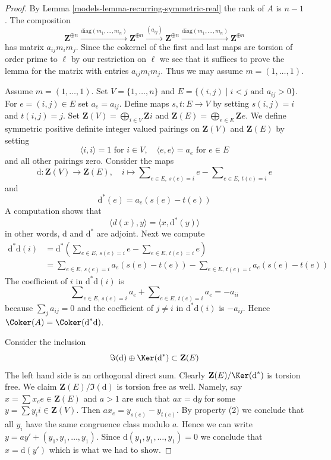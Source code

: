 \begin{proof}

By Lemma \ref{models-lemma-recurring-symmetric-real} the rank of $A$ is $n - 1$.
The composition
$$
\mathbf{Z}^{\oplus n} \xrightarrow{\text{diag}(m_1, \ldots, m_n)}
\mathbf{Z}^{\oplus n} \xrightarrow{(a_{ij})}
\mathbf{Z}^{\oplus n} \xrightarrow{\text{diag}(m_1, \ldots, m_n)}
\mathbf{Z}^{\oplus n}
$$
has matrix $a_{ij}m_im_j$. Since the cokernel of the first and last
maps are torsion of order prime to $\ell$ by our restriction on $\ell$
we see that it suffices to prove the lemma for the matrix
with entries $a_{ij}m_im_j$. Thus we may assume $m = (1, \ldots, 1)$.

\medskip\noindent
Assume $m = (1, \ldots, 1)$. Set $V = \{1, \ldots, n\}$ and
$E = \{(i, j) \mid i < j\text{ and }a_{ij} > 0\}$. For
$e = (i, j) \in E$ set $a_e = a_{ij}$. Define maps
$s, t : E \to V$ by setting $s(i, j) = i$ and $t(i, j) = j$.
Set
$\mathbf{Z}(V) = \bigoplus_{i \in V} \mathbf{Z}i$ and
$\mathbf{Z}(E) = \bigoplus_{e \in E} \mathbf{Z}e$.
We define symmetric positive definite integer valued pairings
on $\mathbf{Z}(V)$ and $\mathbf{Z}(E)$ by setting
$$
\langle i, i \rangle = 1\text{ for }i \in V, \quad
\langle e, e \rangle = a_e\text{ for }e \in E
$$
and all other pairings zero. Consider the maps
$$
\text{d} : \mathbf{Z}(V) \to \mathbf{Z}(E), \quad
i \longmapsto
\sum\nolimits_{e \in E,\ s(e) = i} e - \sum\nolimits_{e \in E,\ t(e) = i} e
$$
and
$$
\text{d}^*(e) = a_e(s(e) - t(e))
$$
A computation shows that
$$
\langle d(x), y\rangle = \langle x, \text{d}^*(y) \rangle
$$
in other words, $\text{d}$ and $\text{d}^*$ are adjoint. Next we compute
\begin{align*}
\text{d}^*\text{d}(i)
& =
\text{d}^*(
\sum\nolimits_{e \in E,\ s(e) = i} e - \sum\nolimits_{e \in E,\ t(e) = i} e) \\
& =
\sum\nolimits_{e \in E,\ s(e) = i} a_e(s(e) - t(e)) -
\sum\nolimits_{e \in E,\ t(e) = i} a_e(s(e) - t(e))
\end{align*}
The coefficient of $i$ in $\text{d}^*\text{d}(i)$ is
$$
\sum\nolimits_{e \in E,\ s(e) = i} a_e +
\sum\nolimits_{e \in E,\ t(e) = i} a_e = - a_{ii}
$$
because $\sum_j a_{ij} = 0$ and the coefficient of
$j \not = i$ in $\text{d}^*\text{d}(i)$ is $-a_{ij}$.
Hence $\Coker(A) = \Coker(\text{d}^*\text{d})$.

\medskip\noindent
Consider the inclusion
$$
\Im(\text{d}) \oplus \Ker(\text{d}^*) \subset \mathbf{Z}(E)
$$
The left hand side is an orthogonal direct sum. Clearly
$\mathbf{Z}(E)/\Ker(\text{d}^*)$ is torsion free.
We claim $\mathbf{Z}(E)/\Im(\text{d})$ is torsion free as well.
Namely, say $x = \sum x_e e \in \mathbf{Z}(E)$ and $a > 1$ are such
that $ax = \text{d}y$ for some $y = \sum y_i i \in \mathbf{Z}(V)$.
Then $a x_e = y_{s(e)} - y_{t(e)}$. By property (2) we conclude
that all $y_i$ have the same congruence class modulo $a$.
Hence we can write $y = a y' + (y_1, y_1, \ldots, y_1)$.
Since $\text{d}(y_1, y_1, \ldots, y_1) = 0$ we conclude
that $x = \text{d}(y')$ which is what we had to show.


\end{proof}
